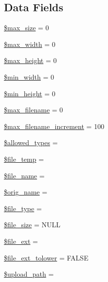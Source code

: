 \subsection*{Data Fields}
\begin{DoxyCompactItemize}
\item 
\hyperlink{class_c_i___upload_a3fec414be9f76cb7ba77ed79b784de62}{\$max\+\_\+size} = 0
\item 
\hyperlink{class_c_i___upload_a7f6a5db40a5fd00c8babbd37480b00fc}{\$max\+\_\+width} = 0
\item 
\hyperlink{class_c_i___upload_a7f2b56fde8cdd8907f9228149fc4b9bc}{\$max\+\_\+height} = 0
\item 
\hyperlink{class_c_i___upload_ad481f92f436b46aa9e400c3350c1971d}{\$min\+\_\+width} = 0
\item 
\hyperlink{class_c_i___upload_ade5021b056dd0ca6a46b293851ee8347}{\$min\+\_\+height} = 0
\item 
\hyperlink{class_c_i___upload_a7c8c80e453111c2521e355b83331a9df}{\$max\+\_\+filename} = 0
\item 
\hyperlink{class_c_i___upload_a95a9bbb06c792949b16879a515366b73}{\$max\+\_\+filename\+\_\+increment} = 100
\item 
\hyperlink{class_c_i___upload_a2e0df9e15179e2db66d161206842d6c0}{\$allowed\+\_\+types} = \textquotesingle{}\textquotesingle{}
\item 
\hyperlink{class_c_i___upload_a8b49917820e40f0b8956d95c1fd6ee6e}{\$file\+\_\+temp} = \textquotesingle{}\textquotesingle{}
\item 
\hyperlink{class_c_i___upload_a59bf132c77b5bee5adff2098cc2a6fbc}{\$file\+\_\+name} = \textquotesingle{}\textquotesingle{}
\item 
\hyperlink{class_c_i___upload_a2704f7723b97b03285de219442ae3e2b}{\$orig\+\_\+name} = \textquotesingle{}\textquotesingle{}
\item 
\hyperlink{class_c_i___upload_a6210dfa92a7e2e5e9db1aa2337ce4cd1}{\$file\+\_\+type} = \textquotesingle{}\textquotesingle{}
\item 
\hyperlink{class_c_i___upload_a5b3595a69dbf686d879bd009ec9c0317}{\$file\+\_\+size} = N\+U\+L\+L
\item 
\hyperlink{class_c_i___upload_a65b080519869bc14d792c1800e3362f5}{\$file\+\_\+ext} = \textquotesingle{}\textquotesingle{}
\item 
\hyperlink{class_c_i___upload_a19d10a169638eedd95a6a85d71146db8}{\$file\+\_\+ext\+\_\+tolower} = F\+A\+L\+S\+E
\item 
\hyperlink{class_c_i___upload_a38507bf82f955d4b13642a3c7fd6e773}{\$upload\+\_\+path} = \textquotesingle{}\textquotesingle{}

\end{DoxyCompactItemize}
